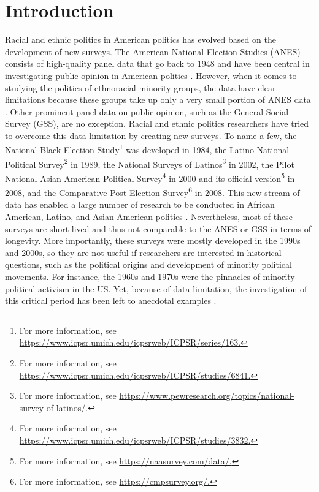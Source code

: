 \section{Introduction}
Racial and ethnic politics in American politics has evolved based on the development of new surveys. The American National Election Studies (ANES) consists of high-quality panel data that go back to 1948 and have been central in investigating public opinion in American politics \citep{campbell1980american, zaller1992nature, bartels1999panel}. However, when it comes to studying the politics of ethnoracial minority groups, the data have clear limitations because these groups take up only a very small portion of ANES data \citep{conway2004politics}. Other prominent panel data on public opinion, such as the General Social Survey (GSS), are no exception. Racial and ethnic politics researchers have tried to overcome this data limitation by creating new surveys. To name a few, the National Black Election Study\footnote{For more information, see \url{https://www.icpsr.umich.edu/icpsrweb/ICPSR/series/163.}} was developed in 1984, the Latino National Political Survey\footnote{For more information, see \url{https://www.icpsr.umich.edu/icpsrweb/ICPSR/studies/6841.}} in 1989, the National Surveys of Latinos\footnote{For more information, see \url{https://www.pewresearch.org/topics/national-survey-of-latinos/.}} in 2002, the Pilot National Asian American Political Survey\footnote{For more information, see \url{https://www.icpsr.umich.edu/icpsrweb/ICPSR/studies/3832.}} in 2000 and its official version\footnote{For more information, see \url{https://naasurvey.com/data/.}} in 2008, and the Comparative Post-Election Survey\footnote{For more information, see \url{https://cmpsurvey.org/.}} in 2008. This new stream of data has enabled a large number of research to be conducted in African American, Latino, and Asian American politics \citep{gurin1990hope, tate1993protest, dawson1994behind, fraga2011latinos, wong2011asian, mcclain2018can}. Nevertheless, most of these surveys are short lived and thus not comparable to the ANES or GSS in terms of longevity. More importantly, these surveys were mostly developed in the 1990s and 2000s, so they are not useful if researchers are interested in historical questions, such as the political origins and development of minority political movements. For instance, the 1960s and 1970s were the pinnacles of minority political activism in the US. Yet, because of data limitation, the investigation of this critical period has been left to anecdotal examples \citep{munoz1989youth, wei_asian_1993, joseph2006black, maeda2012rethinking, ishizuka2016serve, linder2018text}. 

